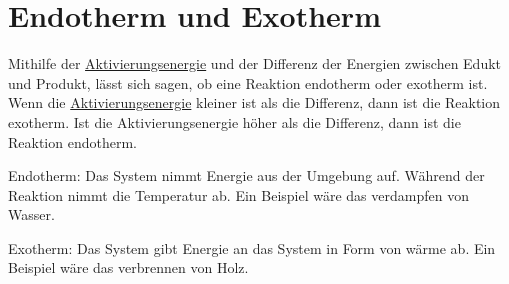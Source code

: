 
\section{Endotherm und Exotherm}\label{sec:endo_exotherm}
Mithilfe der \hyperref[sec:aktivierungsenergie]{Aktivierungsenergie} und der Differenz der Energien zwischen Edukt und Produkt,
lässt sich sagen, ob eine Reaktion endotherm oder exotherm ist.
Wenn die \hyperref[sec:aktivierungsenergie]{Aktivierungsenergie} kleiner ist als die Differenz, dann ist die Reaktion exotherm.
Ist die Aktivierungsenergie höher als die Differenz, dann ist die Reaktion endotherm. 

Endotherm: \newline
Das System nimmt Energie aus der Umgebung auf. 
Während der Reaktion nimmt die Temperatur ab.
Ein Beispiel wäre das verdampfen von Wasser. 

Exotherm: \newline
Das System gibt Energie an das System in Form von wärme ab.
Ein Beispiel wäre das verbrennen von Holz.

